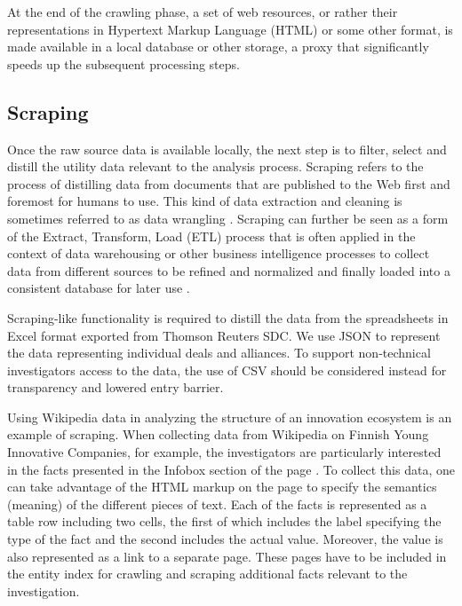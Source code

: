 At the end of the crawling phase, a set of web resources, or rather their representations in Hypertext Markup Language (HTML) or some other format, is made available in a local database or other storage, a proxy that significantly speeds up the subsequent processing steps.

\subsection{Scraping} 

Once the raw source data is available locally, the next step is to filter, select and distill the utility data relevant to the analysis process. Scraping refers to the process of distilling data from documents that are published to the Web first and foremost for humans to use. This kind of data extraction and cleaning is sometimes referred to as data wrangling \citep{Kandel2011}. Scraping can further be seen as a form of the Extract, Transform, Load (ETL) process that is often applied in the context of data warehousing or other business intelligence processes to collect data from different sources to be refined and normalized and finally loaded into a consistent database for later use \citep{Petschulat2010,Vassiliadis2009}. 

Scraping-like functionality is required to distill the data from the spreadsheets in Excel format exported from Thomson Reuters SDC. We use JSON to represent the data representing individual deals and alliances. To support non-technical investigators access to the data, the use of CSV should be considered instead for transparency and lowered entry barrier. 

Using Wikipedia data in analyzing the structure of an innovation ecosystem is an example of scraping. When collecting data from Wikipedia on Finnish Young Innovative Companies, for example, the investigators are particularly interested in the facts presented in the Infobox section of the page \citep[cf.][]{Huhtamaki2007CommunityEcosystem}. To collect this data, one can take advantage of the HTML markup on the page to specify the semantics (meaning) of the different pieces of text. Each of the facts is represented as a table row including two cells, the first of which includes the label specifying the type of the fact and the second includes the actual value. Moreover, the value is also represented as a link to a separate page. These pages have to be included in the entity index for crawling and scraping additional facts relevant to the investigation.

